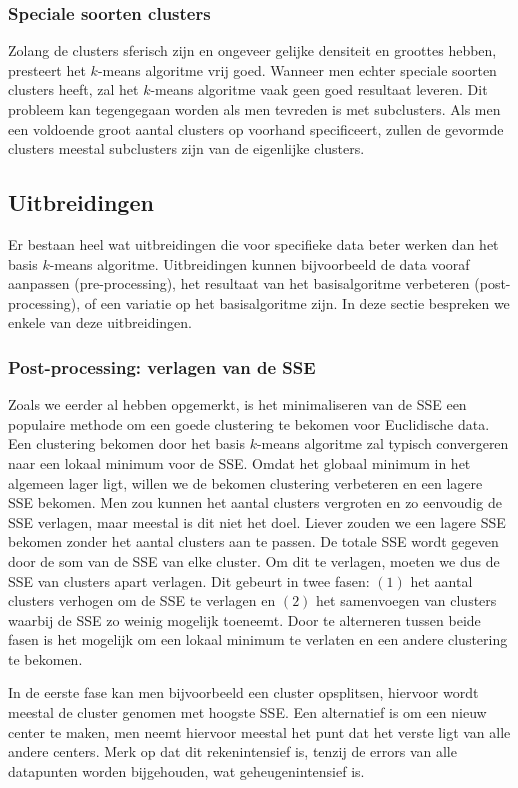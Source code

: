\documentclass[a4paper,12pt]{article}
\theoremstyle{definition}
\begin{document}
\subsubsection{Speciale soorten clusters}
Zolang de clusters sferisch zijn en ongeveer gelijke densiteit en groottes hebben,
presteert het $k$-means algoritme vrij goed. Wanneer men echter speciale soorten
clusters heeft, zal het $k$-means algoritme vaak geen goed resultaat leveren. Dit probleem
kan tegengegaan worden als men tevreden is met subclusters. Als men een voldoende groot
aantal clusters op voorhand specificeert, zullen de gevormde clusters meestal
subclusters zijn van de eigenlijke clusters.

\subsection{Uitbreidingen}
Er bestaan heel wat uitbreidingen die voor specifieke data beter werken
dan het basis $k$-means algoritme. Uitbreidingen kunnen bijvoorbeeld de data
vooraf aanpassen (pre-processing), het resultaat van het basisalgoritme verbeteren
(post-processing),  of een variatie op het basisalgoritme
zijn. In deze sectie bespreken we enkele van deze uitbreidingen.

\subsubsection{Post-processing: verlagen van de SSE}
Zoals we eerder al hebben opgemerkt, is het minimaliseren van de SSE een populaire
methode om een goede clustering te bekomen voor Euclidische data. Een clustering
bekomen door het basis $k$-means algoritme zal typisch convergeren naar een lokaal
minimum voor de SSE. Omdat het globaal minimum in het algemeen lager ligt,
willen we de bekomen clustering verbeteren en een lagere SSE 
bekomen. Men zou kunnen het aantal clusters vergroten en zo eenvoudig de SSE
verlagen, maar meestal is dit niet het doel. Liever zouden we een lagere SSE bekomen
zonder het aantal clusters aan te passen. De totale SSE wordt gegeven door de som van
de SSE van elke cluster. Om dit te verlagen, moeten we dus de SSE van clusters apart
verlagen. Dit gebeurt in twee fasen: $(1)$ het aantal clusters verhogen
om de SSE te verlagen en $(2)$ het samenvoegen van clusters waarbij de SSE zo weinig
mogelijk toeneemt. Door te alterneren tussen beide fasen is het mogelijk om een 
lokaal minimum te verlaten en een andere clustering te bekomen.

In de eerste fase kan men bijvoorbeeld een cluster opsplitsen, hiervoor wordt meestal
de cluster genomen met hoogste SSE. Een alternatief is om een nieuw center
te maken, men neemt hiervoor meestal het punt dat het verste ligt van alle andere
centers. Merk op dat dit rekenintensief is, tenzij de errors van alle datapunten
worden bijgehouden, wat geheugenintensief is.
\end{document}
